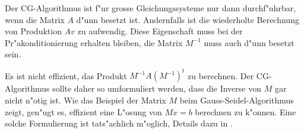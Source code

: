 Der CG-Algorithmus ist f"ur grosse Gleichungssysteme nur dann durchf"uhrbar,
wenn die Matrix $A$ d"unn besetzt ist.
Andernfalls ist die wiederholte Berechnung von Produktion $Av$ zu aufwendig.
Diese Eigenschaft muss bei der Pr"akonditionierung erhalten bleiben,
die Matrix $M^{-1}$ muss auch d"unn besetzt sein.

Es ist nicht effizient, das Produkt $M^{-1}A(M^{-1})^t$ zu berechnen.
Der CG-Algorithmus sollte daher so umformuliert werden, dass die Inverse
von $M$ gar nicht n"otig ist.
Wie das Beispiel der Matrix $M$ beim Gauss-Seidel-Algorithmus zeigt,
gen"ugt es, effizient eine L"osung von $Mx=b$ berechnen zu k"onnen.
Eine solche Formulierung ist tats"achlich m"oglich,
Details dazu in \cite[Chapter 8.6]{skript:watkins}.
